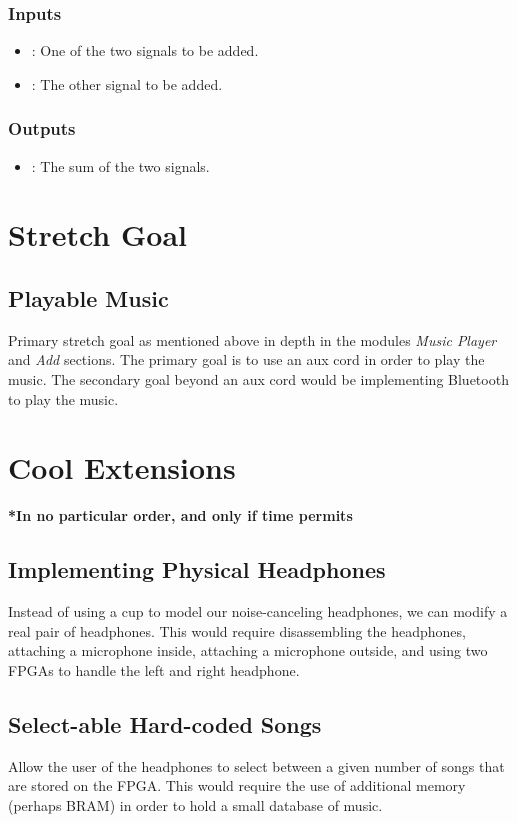 \documentclass{fpgairpods}
\begin{document}
\begin{multicols*}{2}
\subsubsection{Inputs}
\begin{itemize}
    \item {}: One of the two signals to be added.
    \item {}: The other signal to be added.
\end{itemize}
\subsubsection{Outputs}
\begin{itemize}
    \item {}: The sum of the two signals.
\end{itemize}



\section{Stretch Goal}

\subsection{Playable Music}
Primary stretch goal as mentioned above in depth in the modules \textit{Music Player} and \textit{Add} sections. The primary goal is to use an aux cord in order to play the music. The secondary goal beyond an aux cord would be implementing Bluetooth to play the music. 

\section{Cool Extensions}
\textbf{*In no particular order, and only if time permits}

\subsection{Implementing Physical Headphones}
Instead of using a cup to model our noise-canceling headphones, we can modify a real pair of headphones. This would require disassembling the headphones, attaching a microphone inside, attaching a microphone outside, and using two FPGAs to handle the left and right headphone.

\subsection{Select-able Hard-coded Songs}
Allow the user of the headphones to select between a given number of songs that are stored on the FPGA. This would require the use of additional memory (perhaps BRAM) in order to hold a small database of music.



\end{multicols*}
\end{document}
